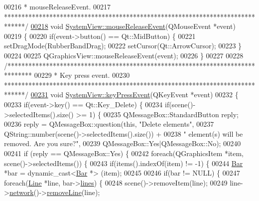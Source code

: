 \begin{DoxyCode}
00216 \textcolor{comment}{ * mouseReleaseEvent.}
00217 \textcolor{comment}{ ******************************************************************************/}
\hypertarget{systemview_8cpp_source_l00218}{}\hyperlink{group___graphics_gaa8a2664405194bbe29daa454aead7416}{00218} \textcolor{keywordtype}{void} \hyperlink{group___graphics_gaa8a2664405194bbe29daa454aead7416}{SystemView::mouseReleaseEvent}(QMouseEvent *event)
00219 \{
00220   \textcolor{keywordflow}{if}(event->button() == Qt::MidButton) \{
00221     setDragMode(RubberBandDrag);
00222     setCursor(Qt::ArrowCursor);
00223   \}
00224 
00225   QGraphicsView::mouseReleaseEvent(event);
00226 \}
00227 
00228 \textcolor{comment}{/*******************************************************************************}
00229 \textcolor{comment}{ * Key press event.}
00230 \textcolor{comment}{ ******************************************************************************/}
\hypertarget{systemview_8cpp_source_l00231}{}\hyperlink{group___graphics_gac28465709119ef75862b33480ad23f56}{00231} \textcolor{keywordtype}{void} \hyperlink{group___graphics_gac28465709119ef75862b33480ad23f56}{SystemView::keyPressEvent}(QKeyEvent *event)
00232 \{
00233   \textcolor{keywordflow}{if}(event->key() == Qt::Key\_Delete) \{
00234     \textcolor{keywordflow}{if}(scene()->selectedItems().size() >= 1) \{
00235       QMessageBox::StandardButton reply;
00236       reply = QMessageBox::question(\textcolor{keyword}{this}, \textcolor{stringliteral}{"Delete elements"},
00237                                     QString::number(scene()->selectedItems().size()) +
00238                                     \textcolor{stringliteral}{" element(s) will be removed. Are you sure?"},
00239                                     QMessageBox::Yes|QMessageBox::No);
00240 
00241       \textcolor{keywordflow}{if} (reply == QMessageBox::Yes) \{
00242         \textcolor{keywordflow}{foreach}(QGraphicsItem *item, scene()->selectedItems()) \{
00243           \textcolor{keywordflow}{if}(items().indexOf(item) != -1) \{
00244             \hyperlink{class_bar}{Bar} *bar = \textcolor{keyword}{dynamic\_cast<}\hyperlink{class_bar}{Bar} *\textcolor{keyword}{>} (item);
00245 
00246             \textcolor{keywordflow}{if}(bar != NULL) \{
00247               \textcolor{keywordflow}{foreach}(\hyperlink{class_line}{Line} *line, bar->\hyperlink{class_bar_a5aabf1f4ac22e20e9cb702a3a7e08eea}{lines}) \{
00248                 scene()->removeItem(line);
00249                 line->\hyperlink{group___models_gaa4cfa330c9c53ddaf86c8f5c17ba1ee0}{network}()->\hyperlink{group___models_ga1eef3317224a7a06348fce07e581a9ad}{removeLine}(line);

\end{DoxyCode}
